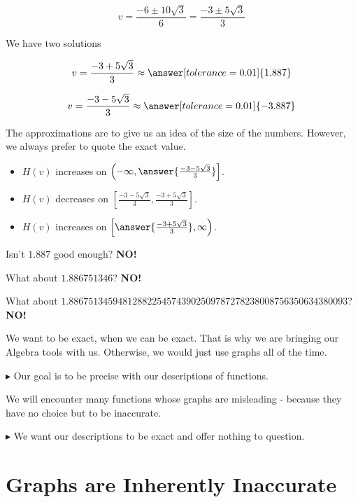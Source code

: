 \documentclass{ximera}
\begin{document}
\begin{example}
\[  v = \frac{-6 \pm 10\sqrt{3}}{6}  =  \frac{-3 \pm 5\sqrt{3}}{3} \]



We have two solutions


\[  v =  \frac{-3 + 5\sqrt{3}}{3}  \approx  \answer[tolerance=0.01]{1.887} \]


\[  v =  \frac{-3 - 5\sqrt{3}}{3} \approx   \answer[tolerance=0.01]{-3.887} \]




The approximations are to give us an idea of the size of the numbers. However, we always prefer to quote the exact value.

\begin{itemize}
\item $H(v)$ increases on $\left( -\infty, \answer{\frac{-3 - 5\sqrt{3}}{3}}   \right]$.
\item $H(v)$ decreases on $\left[ \frac{-3 - 5\sqrt{3}}{3} , \frac{-3 + 5\sqrt{3}}{3}   \right]$.
\item $H(v)$ increases on $\left[ \answer{\frac{-3 + 5\sqrt{3}}{3}}, \infty  \right)$.
\end{itemize}



\end{example}





Isn't $1.887$ good enough?  \textbf{NO!}  

What about $1.886751346$? \textbf{NO!}  

What about $1.886751345948128822545743902509787278238008756350634380093$? \textbf{NO!}  

We want to be exact, when we can be exact.  That is why we are bringing our Algebra tools with us.  Otherwise, we would just use graphs all of the time.

$\blacktriangleright$ Our goal is to be precise with our descriptions of functions.


We will encounter many functions whose graphs are misleading - because they have no choice but to be inaccurate.

$\blacktriangleright$ We want our descriptions to be exact and offer nothing to question.




\section{Graphs are Inherently Inaccurate}
\end{document}
